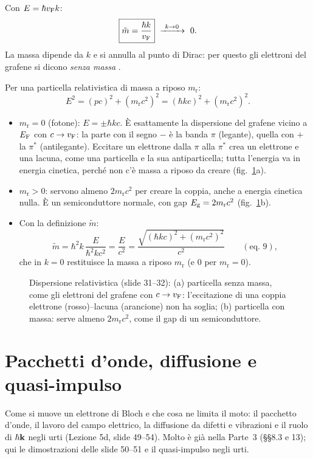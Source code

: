 \documentclass[11pt,a4paper]{article}
\begin{document}
\begin{chiave}
Con $E=\hbar v_{\mathrm F} k$:
\[ \boxed{\tilde m=\frac{\hbar k}{\vF}}\ \xrightarrow{\ k\to0\ }\ 0 . \]
La massa dipende da $k$ e si annulla al punto di Dirac: per questo gli elettroni del grafene si dicono \emph{senza massa} .
\end{chiave}

Per una particella relativistica di massa a riposo $m_{\mathrm r}$:
\[ E^2=(pc)^2+(m_{\mathrm r}c^2)^2=(\hbar kc)^2+(m_{\mathrm r}c^2)^2 . \]
\begin{itemize}
\item \textbf{$m_{\mathrm r}=0$} (fotone): $E=\pm\hbar kc$. È esattamente la dispersione del grafene vicino a $E_{\mathrm F}$ con $c\to v_{\mathrm F}$: la parte con il segno $-$ è la
banda $\pi$ (legante), quella con $+$ la $\pi^*$ (antilegante). Eccitare un elettrone dalla $\pi$ alla $\pi^*$ crea un elettrone e una lacuna, come una
particella e la sua antiparticella; tutta l'energia va in energia cinetica, perché non c'è massa a riposo da creare (fig.~\ref{fig:dirac}a).
\item \textbf{$m_{\mathrm r}>0$}: servono almeno $2m_{\mathrm r}c^2$ per creare la coppia, anche a energia cinetica nulla. È un semiconduttore normale, con
gap $E_{\mathrm g}=2m_{\mathrm r}c^2$ (fig.~\ref{fig:dirac}b).
\item Con la definizione $\tilde m$:
\[ \tilde m=\hbar^2k\,\frac{E}{\hbar^2kc^2}=\frac{E}{c^2}=\frac{\sqrt{(\hbar kc)^2+(m_{\mathrm r}c^2)^2}}{c^2}\qquad(\text{eq.~9}), \]
che in $k=0$ restituisce la massa a riposo $m_{\mathrm r}$ (e $0$ per $m_{\mathrm r}=0$).
\end{itemize}

\begin{figure}[H]
\centering{}
\caption{Dispersione relativistica (slide 31--32): (a) particella senza massa, come gli elettroni del grafene con $c\to v_{\mathrm F}$: l'eccitazione di una coppia
elettrone (rosso)--lacuna (arancione) non ha soglia; (b) particella con massa: serve almeno $2m_{\mathrm r}c^2$, come il gap di un semiconduttore.}\label{fig:dirac}
\end{figure}

\section{Pacchetti d'onde, diffusione e quasi-impulso}\label{sec:trasporto}
Come si muove un elettrone di Bloch e che cosa ne limita il moto: il pacchetto d'onde, il lavoro del campo elettrico, la diffusione da difetti e
vibrazioni e il ruolo di $\hbar\mathbf k$ negli urti (Lezione 5d, slide 49--54). Molto è già nella Parte~3 (§§8.3 e 13); qui le dimostrazioni delle slide 50--51 e il
quasi-impulso negli urti.
\end{document}
